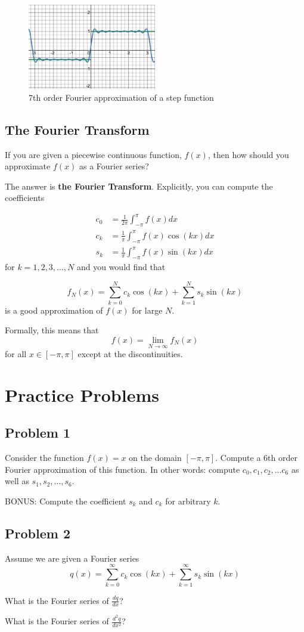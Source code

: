 \documentclass[12pt]{amsart}
\begin{document}
\begin{figure}
    \centering
    \includegraphics[width=0.5\textwidth]{./images/desmos-graph.png}
    \caption{7th order Fourier approximation of a step function}
    \label{fig:fourier}
\end{figure}


\subsection{The Fourier Transform}
If you are given a piecewise continuous function, $f(x)$, then how should
you approximate $f(x)$ as a Fourier series?

The answer is {\bf the Fourier Transform}. 
Explicitly, you can compute the coefficients

\begin{align}
c_0 &= \frac{1}{2\pi} \int_{-\pi}^\pi f(x) dx\\
c_k &= \frac{1}{\pi} \int_{-\pi}^\pi f(x) \cos(kx) dx \\
s_k &= \frac{1}{\pi} \int_{-\pi}^\pi f(x) \sin(kx) dx
\end{align}
for $k=1,2,3,\dots, N$ and you would find that

$$
f_N(x) = \sum_{k=0}^{N} c_k \cos(kx) + \sum_{k=1}^{N} s_k \sin(kx)
$$
is a good approximation of $f(x)$ for large $N$.

Formally, this means that 
$$
  f(x) = \lim_{N \to \infty} f_N(x)
$$
for all $x \in [-\pi, \pi]$ except at the discontinuities.


\section{Practice Problems}

\subsection{Problem 1}
Consider the function $f(x) = x$ on the domain $[-\pi, \pi]$.
Compute a 6th order Fourier approximation of this function.
In other words: compute $c_0, c_1, c_2, \dots c_6$ as well as $s_1, s_2, \dots, s_6$.

BONUS:  Compute the coefficient $s_k$ and $c_k$ for arbitrary $k$.

\subsection{Problem 2}
Assume we are given a Fourier series
$$
    q(x) = \sum_{k=0}^{\infty} c_k \cos(kx) + \sum_{k=1}^{\infty} s_k \sin(kx)
$$

What is the Fourier series of $\frac{dq}{dx}$?

What is the Fourier series of $\frac{d^2q}{dx^2}$?
\end{document}

